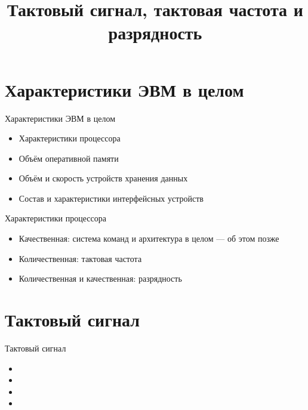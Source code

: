 \documentclass[xetex,aspectratio=43]{beamer}
\title[Тактовая частота и разрядность]{Тактовый сигнал, тактовая частота и разрядность}
\begin{document}
\titleslide

\tocslide

\section{Характеристики ЭВМ в целом}

\begin{frame}{Характеристики ЭВМ в целом}
    \begin{itemize}
        \item Характеристики процессора
        \item Объём оперативной памяти
        \item Объём и скорость устройств хранения данных
        \item Состав и характеристики интерфейсных устройств
    \end{itemize}
\end{frame}

\begin{frame}{Характеристики процессора}
    \begin{itemize}
        \item Качественная: система команд и архитектура в целом --- об этом позже
        \item Количественная: тактовая частота
        \item Количественная и качественная: разрядность
    \end{itemize}
\end{frame}

\section{Тактовый сигнал}

\begin{frame}{Тактовый сигнал}
    \begin{itemize}
            \item {}
            \item {}
            \item {}
            \item {}
    \end{itemize}

\end{frame}
\end{document}

